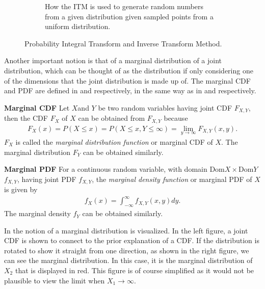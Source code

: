 \begin{figure}[h]
\begin{subfigure}[t]{0.45\linewidth}
        \caption{How the \gls{ITM} is used to generate random numbers from a given distribution given sampled points from a uniform distribution.}
        \label{fig:ITM}
    \end{subfigure}
    \caption{Probability Integral Transform and Inverse Transform Method.}
    \label{fig:TransformMethods}
\end{figure}




Another important notion is that of a marginal distribution of a joint distribution, which can be thought of as the distribution if only considering one of the dimensions that the joint distribution is made up of. The marginal \gls{CDF} and \gls{PDF} are defined in  and  respectively, in the same way as in \citet[p.~81]{evans2004probability} and \citet[p.~34]{wasserman2010statistics} respectively. 

\begin{definition}\label{def:MarginalCDF}
    \textbf{Marginal \gls{CDF}} 
    Let $X$and $Y$ be two random variables having joint \gls{CDF} $F_{X,Y}$, then the \gls{CDF} $F_X$ of $X$ can be obtained from $F_{X,Y}$ because
    \begin{align*}
        F_X(x) =P(X\leq x)
        =P(X\leq x,Y \leq \infty)
        =\lim_{y\to\infty} F_{X,Y}(x,y).
    \end{align*}
    $F_X$ is called the \emph{marginal distribution function} or marginal \gls{CDF} of $X$. The marginal distribution $F_Y$ can be obtained similarly. 
\end{definition}

\begin{definition}\label{def:MarginalPDF}
    \textbf{Marginal \gls{PDF}}
    For a continuous random variable, with domain $\mathrm{Dom}X\times \mathrm{Dom}Y$ $f_{X,Y}$, having joint \gls{PDF} $f_{X,Y}$, the \emph{marginal density function} or marginal \gls{PDF} of $X$ is given by
    \begin{align*}
        f_X(x) = \int_{-\infty}^\infty f_{X,Y}(x,y)dy.
    \end{align*}
    The marginal density $f_Y$ can be obtained similarly. 
\end{definition}

In  the notion of a marginal distribution is visualized. In the left figure, a joint \gls{CDF} is shown to connect to the prior explanation of a \gls{CDF}. If the distribution is rotated to show it straight from one direction, as shown in the right figure, we can see the marginal distribution. In this case, it is the marginal distribution of $X_2$ that is displayed in red. This figure is of course simplified as it would not be plausible to view the limit when $X_1 \to \infty$.

